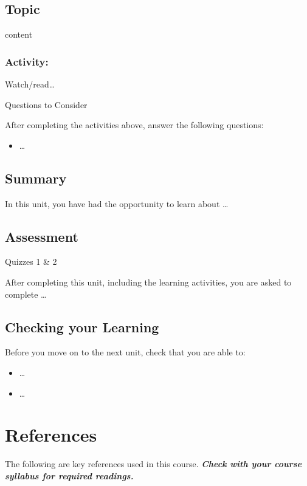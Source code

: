 \documentclass[
]{book}
\providecommand{\tightlist}{%
  \setlength{\itemsep}{0pt}\setlength{\parskip}{0pt}}
\theoremstyle{definition}
\theoremstyle{definition}
\theoremstyle{definition}
\theoremstyle{definition}
\theoremstyle{remark}
\begin{document}
\hypertarget{topic-11}{%
\section{Topic}\label{topic-11}}

content

\hypertarget{activity-15}{%
\subsection*{Activity:}\label{activity-15}}

\begin{reflect}
Watch/read\ldots{}

{Questions to Consider}

After completing the activities above, answer the following questions:

\begin{itemize}
\tightlist
\item
  \ldots{}
\end{itemize}
\end{reflect}

\hypertarget{summary-5}{%
\section*{Summary}\label{summary-5}}

In this unit, you have had the opportunity to learn about \ldots{}

\hypertarget{assessment-5}{%
\section*{Assessment}\label{assessment-5}}

\begin{assessment}
{Quizzes 1 \& 2}

After completing this unit, including the learning activities, you are asked to complete \ldots{}
\end{assessment}

\hypertarget{checking-your-learning-5}{%
\section*{Checking your Learning}\label{checking-your-learning-5}}

\begin{progress}
Before you move on to the next unit, check that you are able to:

\begin{itemize}
\tightlist
\item
  \ldots{}
\item
  \ldots{}
\end{itemize}
\end{progress}

\hypertarget{references}{%
\chapter*{References}\label{references}}

The following are key references used in this course. \textbf{\emph{Check with your course syllabus for required readings.}}

  
\end{document}
